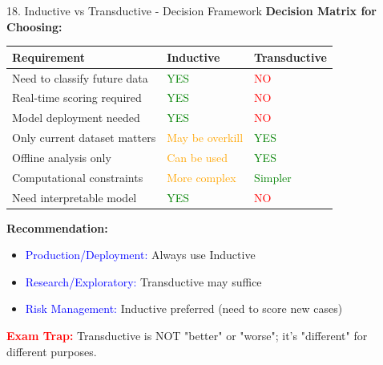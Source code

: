 \documentclass[8pt]{beamer}
\begin{document}
	\begin{frame}{18. Inductive vs Transductive - Decision Framework}
		\fontsize{6.5}{7.5}\selectfont
		\textbf{Decision Matrix for Choosing:}
		
		\begin{tabular}{|p{2.8cm}|p{3.0cm}|p{3.0cm}|}
			\hline
			\textbf{Requirement} & \textbf{Inductive} & \textbf{Transductive} \\
			\hline
			Need to classify future data & \textcolor{green}{YES} & \textcolor{red}{NO} \\
			\hline
			Real-time scoring required & \textcolor{green}{YES} & \textcolor{red}{NO} \\
			\hline
			Model deployment needed & \textcolor{green}{YES} & \textcolor{red}{NO} \\
			\hline
			Only current dataset matters & \textcolor{orange}{May be overkill} & \textcolor{green}{YES} \\
			\hline
			Offline analysis only & \textcolor{orange}{Can be used} & \textcolor{green}{YES} \\
			\hline
			Computational constraints & \textcolor{orange}{More complex} & \textcolor{green}{Simpler} \\
			\hline
			Need interpretable model & \textcolor{green}{YES} & \textcolor{red}{NO} \\
			\hline
		\end{tabular}
		
		\textbf{Recommendation:}
		\begin{itemize}
			\item \textcolor{blue}{Production/Deployment:} Always use Inductive
			\item \textcolor{blue}{Research/Exploratory:} Transductive may suffice
			\item \textcolor{blue}{Risk Management:} Inductive preferred (need to score new cases)
		\end{itemize}
		
		\textcolor{red}{\textbf{Exam Trap:}} Transductive is NOT "better" or "worse"; it's "different" for different purposes.
	\end{frame}
	
	
\end{document}
